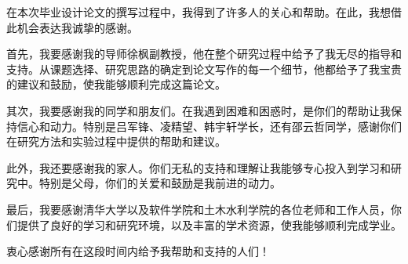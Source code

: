 
\begin{acknowledgements}
  在本次毕业设计论文的撰写过程中，我得到了许多人的关心和帮助。在此，我想借此机会表达我诚挚的感谢。

  首先，我要感谢我的导师徐枫副教授，他在整个研究过程中给予了我无尽的指导和支持。从课题选择、研究思路的确定到论文写作的每一个细节，他都给予了我宝贵的建议和鼓励，使我能够顺利完成这篇论文。

  其次，我要感谢我的同学和朋友们。在我遇到困难和困惑时，是你们的帮助让我保持信心和动力。特别是吕军锋、凌精望、韩宇轩学长，还有邵云哲同学，感谢你们在研究方法和实验过程中提供的帮助和建议。

  此外，我还要感谢我的家人。你们无私的支持和理解让我能够专心投入到学习和研究中。特别是父母，你们的关爱和鼓励是我前进的动力。

  最后，我要感谢清华大学以及软件学院和土木水利学院的各位老师和工作人员，你们提供了良好的学习和研究环境，以及丰富的学术资源，使我能够顺利完成学业。

  衷心感谢所有在这段时间内给予我帮助和支持的人们！
\end{acknowledgements}
